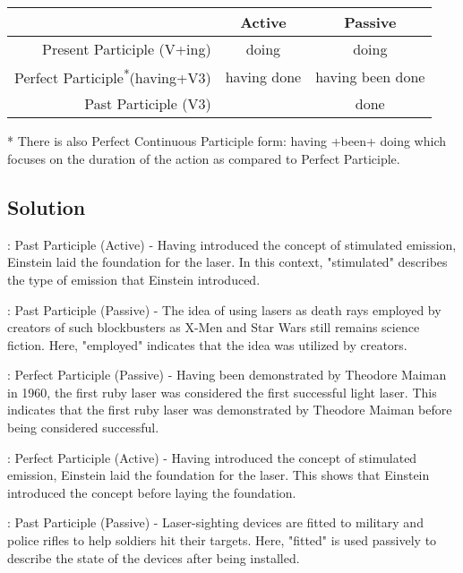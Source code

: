 \begin{large}
      \begin{tabular}{|r|c|c|}
            \hline
                                                             & Active      & Passive          \\
            \hline
            Present Participle (V+ing)                       & doing       & doing            \\
            Perfect Participle\textsuperscript{*}(having+V3) & having done & having been done \\
            Past Participle (V3)                             &             & done             \\
            \hline
      \end{tabular}
\end{large}

* There is also Perfect Continuous Participle form: having +been+ doing which focuses on the
duration of the action as compared to Perfect Participle.

\subsection*{Solution}
: Past Participle (Active) - Having introduced the concept of stimulated emission, Einstein laid the foundation for the laser. In this context, "stimulated" describes the type of emission that Einstein introduced.

: Past Participle (Passive) - The idea of using lasers as death rays employed by creators of such blockbusters as X-Men and Star Wars still remains science fiction. Here, "employed" indicates that the idea was utilized by creators.

: Perfect Participle (Passive) - Having been demonstrated by Theodore Maiman in 1960, the first ruby laser was considered the first successful light laser. This indicates that the first ruby laser was demonstrated by Theodore Maiman before being considered successful.

: Perfect Participle (Active) - Having introduced the concept of stimulated emission, Einstein laid the foundation for the laser. This shows that Einstein introduced the concept before laying the foundation.

: Past Participle (Passive) - Laser-sighting devices are fitted to military and police rifles to help soldiers hit their targets. Here, "fitted" is used passively to describe the state of the devices after being installed.

